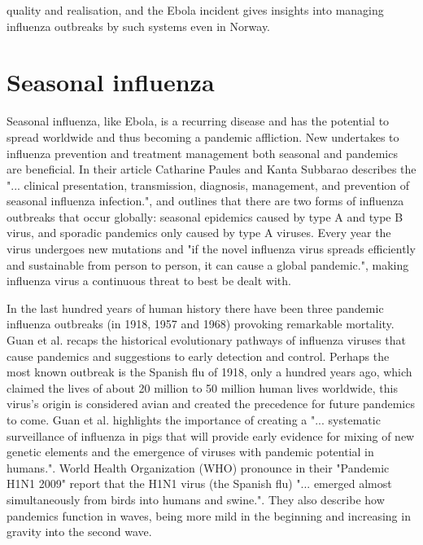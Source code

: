 quality and realisation, and the Ebola incident gives insights into managing influenza outbreaks by such systems even in Norway.




\section{Seasonal influenza}
Seasonal influenza, like Ebola, is a recurring disease and has the potential to spread worldwide and thus becoming a pandemic affliction. New undertakes to influenza prevention and treatment management both seasonal and pandemics are beneficial. In their article Catharine Paules and Kanta Subbarao\cite{article_Paules} describes the "... clinical presentation, transmission, diagnosis, management, and prevention of seasonal influenza infection.", and outlines that there are two forms of influenza outbreaks that occur globally: seasonal epidemics caused by type A and type B virus, and sporadic pandemics only caused by type A viruses. Every year the virus undergoes new mutations and "if the novel influenza virus spreads efficiently and sustainable from person to person, it can cause a global pandemic.", making influenza virus a continuous threat to best be dealt with.

In the last hundred years of human history there have been three pandemic influenza outbreaks (in 1918, 1957 and 1968) provoking remarkable mortality. Guan et al.\cite{guan2010emergence} recaps the historical evolutionary pathways of influenza viruses that cause pandemics and suggestions to early detection and control. Perhaps the most known outbreak is the Spanish flu of 1918, only a hundred years ago, which claimed the lives of about 20 million to 50 million human lives worldwide, this virus's origin is considered avian and created the precedence for future pandemics to come. Guan et al. highlights the importance of creating a "... systematic surveillance of influenza in pigs that will provide early evidence for mixing of new genetic elements and the emergence of viruses with pandemic potential in humans.". World Health Organization (WHO) pronounce in their "Pandemic H1N1 2009"\cite{world2009pandemic} report that the H1N1 virus (the Spanish flu) "... emerged almost simultaneously from birds into humans and swine.". They also describe how pandemics function in waves, being more mild in the beginning and increasing in gravity into the second wave.

